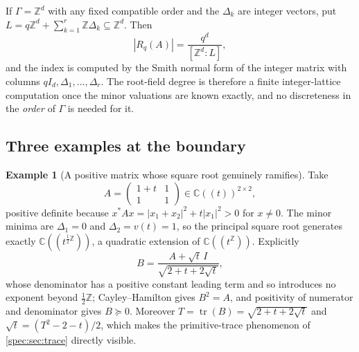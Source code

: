 \documentclass[11pt,a4paper]{article}
\numberwithin{equation}{section}
\theoremstyle{definition}
\newtheorem{example}[example]{Example}
\theoremstyle{remark}
\newcommand{\C}{\mathbb C}
\newcommand{\Z}{\mathbb Z}
\newcommand{\tr}{\operatorname{tr}}
\begin{document}
If $\Gamma=\Z^d$ with any fixed compatible order and the $\Delta_k$ are
integer vectors, put $L=q\Z^d+\sum_{k=1}^r\Z\Delta_k\subseteq\Z^d$. Then
\begin{equation}\label{spec:eq:latticedegree}
 |R_q(A)|=\frac{q^d}{[\Z^d:L]},
\end{equation}
and the index is computed by the Smith normal form of the integer matrix
with columns $qI_d,\Delta_1,\ldots,\Delta_r$. The root-field degree is
therefore a finite integer-lattice computation once the minor valuations are
known exactly, and no discreteness in the \emph{order} of $\Gamma$ is needed
for it.

\subsection{Three examples at the boundary}

\begin{example}[A positive matrix whose square root genuinely ramifies]\label{spec:ex:ramifying}
Take
\begin{equation}\label{spec:eq:positive2}
 A=\begin{pmatrix}1+t&1\\1&1\end{pmatrix}\in\C((t))^{2\times2},
\end{equation}
positive definite because $x^*Ax=|x_1+x_2|^2+t|x_1|^2>0$ for $x\ne0$. The
minor minima are $\Delta_1=0$ and $\Delta_2=v(t)=1$, so the principal square
root generates exactly $\C((t^{\frac12\Z}))$, a quadratic extension of
$\C((t^\Z))$. Explicitly
\begin{equation}\label{spec:eq:positive2root}
 B=\frac{A+\sqrt t\,I}{\sqrt{2+t+2\sqrt t}},
\end{equation}
whose denominator has a positive constant leading term and so introduces no
exponent beyond $\tfrac12\Z$; Cayley--Hamilton gives $B^2=A$, and positivity
of numerator and denominator gives $B\succeq0$. Moreover
$T=\tr(B)=\sqrt{2+t+2\sqrt t}$ and $\sqrt t=(T^2-2-t)/2$, which makes the
primitive-trace phenomenon of \cref{spec:sec:trace} directly visible.
\end{example}
\end{document}
